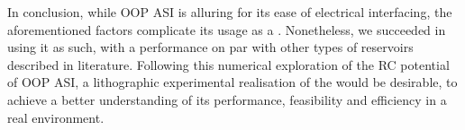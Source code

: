 \newpage
In conclusion, while OOP ASI is alluring for its ease of electrical interfacing, the aforementioned factors complicate its usage as a .
Nonetheless, we succeeded in using it as such, with a performance on par with other types of reservoirs described in literature.
Following this numerical exploration of the RC potential of OOP ASI, a lithographic experimental realisation of the  would be desirable, to achieve a better understanding of its performance, feasibility and efficiency in a real environment.



